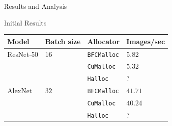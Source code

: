 \documentclass[10pt]{beamer}
\newcommand{\resnettimebfc}{$5.82$}
\newcommand{\resnettimecuda}{$5.32$}
\newcommand{\resnettimehalloc}{$?$}
\newcommand{\alexnettimebfc}{$41.71$}
\newcommand{\alexnettimecuda}{$40.24$}
\newcommand{\alexnettimehalloc}{$?$}
\begin{document}
\begin{frame}[fragile]{Results and Analysis}


\begin{exampleblock}{Initial Results}
    \begin{table}[!ht]
    \centering
    \label{tab:results}
    \begin{tabular}{|l|l|l|l|}
    \hline
    Model     & Batch size  & Allocator          & Images/sec         \\ \hline
    ResNet-50 & $16$        & \texttt{BFCMalloc} & \resnettimebfc     \\ \cline{3-4} 
              &             & \texttt{CuMalloc}  & \resnettimecuda    \\ \cline{3-4} 
              &             & \texttt{Halloc}    & \resnettimehalloc  \\ \hline
    AlexNet   & $32$        & \texttt{BFCMalloc} & \alexnettimebfc    \\ \cline{3-4} 
              &             & \texttt{CuMalloc}  & \alexnettimecuda   \\ \cline{3-4} 
              &             & \texttt{Halloc}    & \alexnettimehalloc \\ \hline
    \end{tabular}
    \end{table}
\end{exampleblock}

\end{frame}
\end{document}
